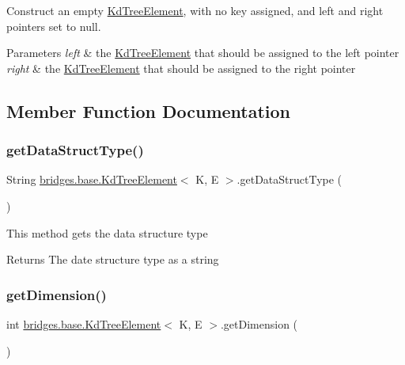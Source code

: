 Construct an empty \mbox{\hyperlink{classbridges_1_1base_1_1_kd_tree_element}{Kd\+Tree\+Element}}, with no key assigned, and left and right pointers set to null. 
\begin{DoxyParams}{Parameters}
{\em left} & the \mbox{\hyperlink{classbridges_1_1base_1_1_kd_tree_element}{Kd\+Tree\+Element}} that should be assigned to the left pointer \\
\hline
{\em right} & the \mbox{\hyperlink{classbridges_1_1base_1_1_kd_tree_element}{Kd\+Tree\+Element}} that should be assigned to the right pointer \\
\hline
\end{DoxyParams}


\subsection{Member Function Documentation}
\mbox{\label{classbridges_1_1base_1_1_kd_tree_element_a56b98bd1f3e1e5c0c37519c4b3cf5ba2}} 
\subsubsection{\texorpdfstring{getDataStructType()}{getDataStructType()}}
{\footnotesize\ttfamily String \mbox{\hyperlink{classbridges_1_1base_1_1_kd_tree_element}{bridges.\+base.\+Kd\+Tree\+Element}}$<$ K, E $>$.get\+Data\+Struct\+Type (\begin{DoxyParamCaption}{ }\end{DoxyParamCaption})}

This method gets the data structure type

\begin{DoxyReturn}{Returns}
The date structure type as a string 
\end{DoxyReturn}
\mbox{\label{classbridges_1_1base_1_1_kd_tree_element_a2469fcfe38e921ae48338ef1fd347c4a}} 
\subsubsection{\texorpdfstring{getDimension()}{getDimension()}}
{\footnotesize\ttfamily int \mbox{\hyperlink{classbridges_1_1base_1_1_kd_tree_element}{bridges.\+base.\+Kd\+Tree\+Element}}$<$ K, E $>$.get\+Dimension (\begin{DoxyParamCaption}{ }\end{DoxyParamCaption})}

